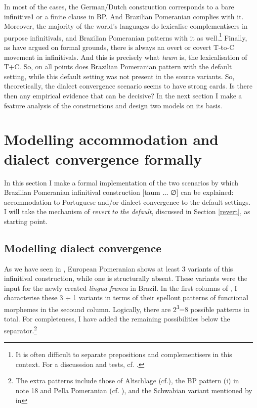 \documentclass[output=paper,hidelinks,draftmode]{langscibook}
\begin{document}
{\z 
In most of the cases, the German/Dutch construction corresponds to a bare infinitive1 or a finite clause in BP.} And Brazilian Pomeranian complies with it. Moreover, the majority of the world's languages do lexicalise complementisers in purpose infinitivals, and Brazilian Pomeranian patterns with it as well.\footnote{It is often difficult to separate prepositions and complementisers in this context. For a discusssion and tests, cf. \citet{Bennis1987}.} Finally, as \citet{Pesetsky2007} have argued on formal grounds, there is always an overt or covert T-to-C movement in infinitivals. And this is precisely what \textit{taum} is, the lexicalisation of T+C. So, on all points does Brazilian Pomeranian pattern with the default setting, while this default setting was not present in the source variants. So, theoretically, the dialect convergence scenario seems to have strong cards. Is there then any empirical evidence that can be decisive? In the next section I make a feature analysis of the constructions and design two models on its basis.

\section{Modelling accommodation and dialect convergence formally}

In this section I make a formal implementation of the two scenarios by which Brazilian Pomeranian infinitival construction [taum ... ∅] can be explained: accommodation to Portuguese and/or dialect convergence to the default settings. I will take the mechanism of \textit{revert} \textit{to} \textit{the} \textit{default}, discussed in Section \ref{revert}, as starting point.

\subsection{Modelling dialect convergence}\label{conv}

As we have seen in , European Pomeranian shows at least 3 variants of this infinitival construction, while one is structurally absent. These variants were the input for the newly created \textit{lingua} \textit{franca} in Brazil. In the first columns of , I characterise these 3 + 1 variants in terms of their spellout patterns of functional morphemes in the secound column. Logically, there are 2\textsuperscript{3}=8 possible patterns in total. For completeness, I have added the remaining possibilities below the separator.\footnote{The extra patterns include those of Altschlage (cf.), the BP pattern (i) in note 18 and Pella Pomeranian (cf. ), and the Schwabian variant mentioned by \citet{Müller1996} in }
\end{document}
